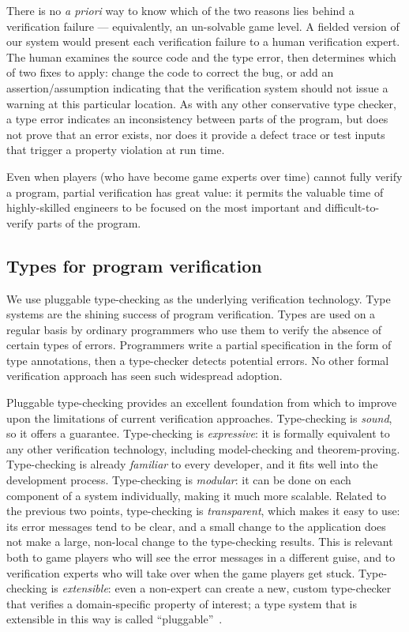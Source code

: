 \documentclass{sig-alternate}
\begin{document}
\noindent
There is no \emph{a priori} way to know which of the two reasons lies
behind a verification failure --- equivalently, an un-solvable game
level.  A fielded version of our system would present each verification failure to a human
verification expert.  The human examines the source code and the type
error, then determines which of two fixes to apply: change the code to correct the
bug, or add an assertion/assumption indicating that the verification
system should not issue a warning at this particular location.
As with any other conservative type checker, a type error indicates an
inconsistency between parts of the program, but does not prove that an
error exists, nor does it provide a defect trace or test inputs that
trigger a property violation at run time.


Even when players (who have become game experts over time) cannot fully
verify a program,
partial verification has great value: it permits the valuable time of
highly-skilled engineers to be focused on the most important and
difficult-to-verify parts of
the program.

\subsection{Types for program verification}

We use pluggable type-checking as the underlying verification
technology.  Type systems are the shining success of program
verification.  Types are used on a regular basis by ordinary
programmers who use them to verify the absence of certain types of
errors.  Programmers write a partial specification in the form of type
annotations, then a type-checker detects potential errors.  No other
formal verification approach has seen such widespread adoption.

Pluggable type-checking provides an excellent foundation from which to
improve upon the limitations of current verification
approaches. Type-checking is \emph{sound}, so it offers a guarantee.
Type-checking is \emph{expressive}: it is formally equivalent
\cite{CurryHoward2006,MartinLoef1984,CoquandHuet1988,Cousot1997,CousotCousot2000,NaikPalsberg2005}
to any other verification technology, including model-checking and
theorem-proving.  Type-checking is already \emph{familiar} to every
developer, and it fits well into the development process.
Type-checking is \emph{modular}: it can be done on each component of a
system individually, making it much more scalable.  Related to the
previous two points, type-checking is \emph{transparent}, which makes
it easy to use: its error messages tend to be clear, and a small
change to the application does not make a large, non-local change to
the type-checking results.  This is relevant both to game players who
will see the error messages in a different guise, and to verification
experts who will take over when the game players get stuck.
Type-checking is \emph{extensible}: even a non-expert can create a
new, custom type-checker that verifies a domain-specific property of
interest; a type system that is extensible in this way is called
``pluggable''~\cite{Bracha2004}.
\end{document}

